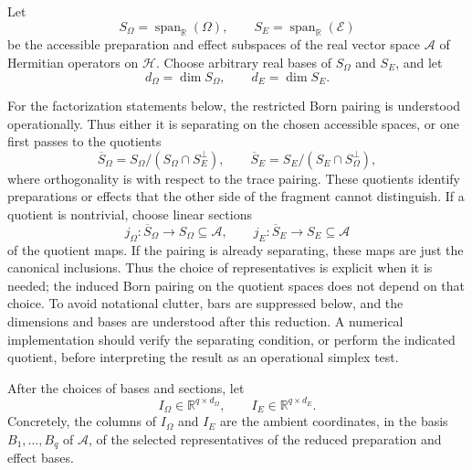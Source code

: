 \documentclass[aps,pra,twocolumn,superscriptaddress,nofootinbib]{revtex4-2}
\newcommand{\E}{\mathcal{E}}
\newcommand{\HH}{\mathcal{H}}
\newcommand{\OmegaSet}{\Omega}
\begin{document}
Let
\begin{equation}
        S_\Omega=\operatorname{span}_{\mathbb R}(\OmegaSet),
        \qquad
        S_E=\operatorname{span}_{\mathbb R}(\E)
\end{equation}
be the accessible preparation and effect subspaces of the real vector space
$\mathcal A$ of Hermitian operators on $\HH$.  Choose arbitrary real bases of
$S_\Omega$ and $S_E$, and let
\begin{equation}
        d_\Omega=\dim S_\Omega,
        \qquad
        d_E=\dim S_E.
\end{equation}

For the factorization statements below, the restricted Born pairing is
understood operationally.  Thus either it is separating on the chosen
accessible spaces, or one first passes to the quotients
\begin{equation}
        \overline S_\Omega=
        S_\Omega/(S_\Omega\cap S_E^\perp),
        \qquad
        \overline S_E=
        S_E/(S_E\cap S_\Omega^\perp),
        \label{eq:operational-quotients}
\end{equation}
where orthogonality is with respect to the trace pairing.  These quotients
identify preparations or effects that the other side of the fragment cannot
distinguish.  If a quotient is nontrivial, choose linear sections
\begin{equation}
        j_\Omega:\overline S_\Omega\longrightarrow S_\Omega\subseteq\mathcal A,
        \qquad
        j_E:\overline S_E\longrightarrow S_E\subseteq\mathcal A
\end{equation}
of the quotient maps.  If the pairing is already separating, these maps are
just the canonical inclusions.  Thus the choice of representatives is explicit
when it is needed; the induced Born pairing on the quotient spaces does not
depend on that choice.  To avoid notational clutter, bars are suppressed below,
and the dimensions and bases are understood after this reduction.  A numerical
implementation should verify the separating condition, or perform the indicated
quotient, before interpreting the result as an operational simplex test.

After the choices of bases and sections, let
\begin{equation}
        I_\Omega\in\mathbb R^{q\times d_\Omega},
        \qquad
        I_E\in\mathbb R^{q\times d_E}.
\end{equation}
Concretely, the columns of $I_\Omega$ and $I_E$ are the ambient coordinates,
in the basis $B_1,\ldots,B_q$ of $\mathcal A$, of the selected
representatives of the reduced preparation and effect bases.
\end{document}
